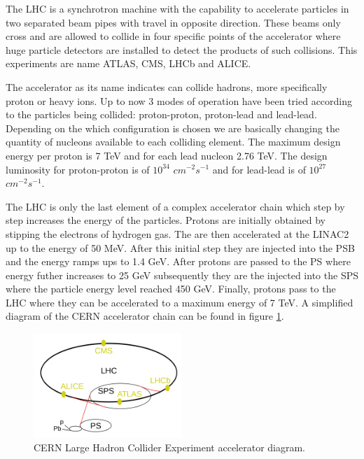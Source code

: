 The \gls{LHC} is a synchrotron machine with the capability to accelerate particles in two separated beam pipes with travel in opposite direction.  These beams only cross and are allowed to collide in four specific points of the accelerator where huge particle detectors are installed to detect the products of such collisions. This experiments are name ATLAS\cite{ARTICLE:TheATLASExperiment}, CMS\cite{ARTICLE:TheCMSExperiment}, LHCb\cite{ARTICLE:TheLHCbExperiment} and ALICE\cite{ARTICLE:TheALICEExperiment}.

The accelerator as its name indicates can collide hadrons, more specifically proton or heavy ions. Up to now 3 modes of operation have been tried according to the particles being collided: proton-proton, proton-lead and lead-lead. Depending on the which configuration is chosen we are basically changing the quantity of nucleons available to each colliding element. The maximum design energy per proton is 7 TeV and for each lead nucleon 2.76 TeV. The design luminosity for proton-proton is of $10^{34}$ $cm^{-2}s^{-1}$ and for lead-lead is of $10^{27}$ $cm^{-2}s^{-1}$.

The \gls{LHC} is only the last element of a complex accelerator chain which step by step increases the energy of the particles. Protons are initially obtained by stipping the electrons of hydrogen gas. The are then accelerated at the \gls{LINAC2} up to the energy of 50 MeV. After this initial step they are injected into the \gls{PSB} and the energy ramps ups to 1.4 GeV. After protons are passed to the \gls{PS} where energy futher increases to 25 GeV subsequently they are the injected into the \gls{SPS} where the particle energy level reached 450 GeV. Finally, protons pass to the \gls{LHC} where they can be accelerated to a maximum energy of 7 TeV. A simplified diagram of the \gls{CERN} accelerator chain can be found in figure \ref{FIGURE:ExperimentalApparatus_LHCAccelaratorChain}.

\begin{figure}[!htb]
  \centering
  \includegraphics[width=0.50\textwidth]{Chapter02/LHC/Images/LHCAccelaratorChain.png}
  \caption{CERN Large Hadron Collider Experiment accelerator diagram.}
  \label{FIGURE:ExperimentalApparatus_LHCAccelaratorChain}
\end{figure}

